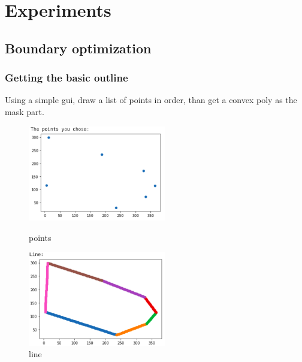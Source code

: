 \documentclass[letterpaper,12pt]{article}
\begin{document}
\section{Experiments}
\subsection{Boundary optimization}
\subsubsection{Getting the basic outline}
Using a simple gui, draw a list of points in order, than get a convex poly as the mask part.
\begin{figure}[htbp]
	\centering
	\begin{minipage}[t]{0.48\textwidth}
		\centering
		\includegraphics[width=6cm]{Image/3-1.png}
		\caption{points}
	\end{minipage}
	\begin{minipage}[t]{0.48\textwidth}
		\centering
		\includegraphics[width=6cm]{Image/3-2.png}
		\caption{line}
	\end{minipage}
\end{figure}
\newpage
\end{document}
